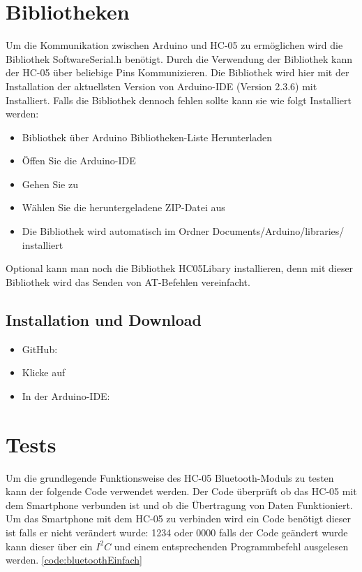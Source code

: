 	
\section{Bibliotheken}

Um die Kommunikation zwischen Arduino und HC-05 zu ermöglichen wird die Bibliothek SoftwareSerial.h benötigt. Durch die Verwendung der Bibliothek kann der HC-05 über beliebige Pins Kommunizieren. Die Bibliothek wird hier mit der Installation der aktuellsten Version von Arduino-IDE (Version 2.3.6) mit Installiert. Falls die Bibliothek dennoch fehlen sollte kann sie wie folgt Installiert werden:

\begin{itemize}
	\item Bibliothek über Arduino Bibliotheken-Liste Herunterladen
	\item Öffen Sie die Arduino-IDE
	\item Gehen Sie zu 
	\item Wählen Sie die heruntergeladene ZIP-Datei aus
	\item Die Bibliothek wird automatisch im Ordner Documents/Arduino/libraries/ installiert 
\end{itemize}

Optional kann man noch die Bibliothek HC05Libary installieren, denn mit dieser Bibliothek wird das Senden von AT-Befehlen vereinfacht.\\

\subsection{Installation und Download}

\begin{itemize}
	\item GitHub: 
	\item Klicke auf 
	\item In der Arduino-IDE: 
\end{itemize}


\section{Tests}
Um die grundlegende Funktionsweise des HC-05 Bluetooth-Moduls zu testen kann der folgende Code verwendet werden. Der Code überprüft ob das HC-05 mit dem Smartphone verbunden ist und ob die Übertragung von Daten Funktioniert. Um das Smartphone mit dem HC-05 zu verbinden wird ein Code benötigt dieser ist falls er nicht verändert wurde: 1234 oder 0000 falls der Code geändert wurde kann dieser über ein $I^2C $ und einem entsprechenden Programmbefehl ausgelesen werden. \ref{code:bluetoothEinfach}

